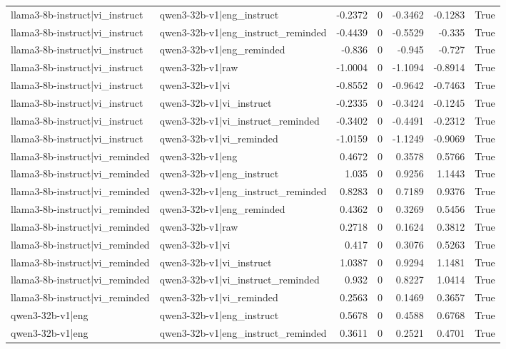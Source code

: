 \begin{table}
\begin{tabular}{l l r r r r l}
llama3-8b-instruct|vi_instruct & qwen3-32b-v1|eng_instruct & -0.2372 & 0 & -0.3462 & -0.1283 & True \\
llama3-8b-instruct|vi_instruct & qwen3-32b-v1|eng_instruct_reminded & -0.4439 & 0 & -0.5529 & -0.335 & True \\
llama3-8b-instruct|vi_instruct & qwen3-32b-v1|eng_reminded & -0.836 & 0 & -0.945 & -0.727 & True \\
llama3-8b-instruct|vi_instruct & qwen3-32b-v1|raw & -1.0004 & 0 & -1.1094 & -0.8914 & True \\
llama3-8b-instruct|vi_instruct & qwen3-32b-v1|vi & -0.8552 & 0 & -0.9642 & -0.7463 & True \\
llama3-8b-instruct|vi_instruct & qwen3-32b-v1|vi_instruct & -0.2335 & 0 & -0.3424 & -0.1245 & True \\
llama3-8b-instruct|vi_instruct & qwen3-32b-v1|vi_instruct_reminded & -0.3402 & 0 & -0.4491 & -0.2312 & True \\
llama3-8b-instruct|vi_instruct & qwen3-32b-v1|vi_reminded & -1.0159 & 0 & -1.1249 & -0.9069 & True \\
llama3-8b-instruct|vi_reminded & qwen3-32b-v1|eng & 0.4672 & 0 & 0.3578 & 0.5766 & True \\
llama3-8b-instruct|vi_reminded & qwen3-32b-v1|eng_instruct & 1.035 & 0 & 0.9256 & 1.1443 & True \\
llama3-8b-instruct|vi_reminded & qwen3-32b-v1|eng_instruct_reminded & 0.8283 & 0 & 0.7189 & 0.9376 & True \\
llama3-8b-instruct|vi_reminded & qwen3-32b-v1|eng_reminded & 0.4362 & 0 & 0.3269 & 0.5456 & True \\
llama3-8b-instruct|vi_reminded & qwen3-32b-v1|raw & 0.2718 & 0 & 0.1624 & 0.3812 & True \\
llama3-8b-instruct|vi_reminded & qwen3-32b-v1|vi & 0.417 & 0 & 0.3076 & 0.5263 & True \\
llama3-8b-instruct|vi_reminded & qwen3-32b-v1|vi_instruct & 1.0387 & 0 & 0.9294 & 1.1481 & True \\
llama3-8b-instruct|vi_reminded & qwen3-32b-v1|vi_instruct_reminded & 0.932 & 0 & 0.8227 & 1.0414 & True \\
llama3-8b-instruct|vi_reminded & qwen3-32b-v1|vi_reminded & 0.2563 & 0 & 0.1469 & 0.3657 & True \\
qwen3-32b-v1|eng & qwen3-32b-v1|eng_instruct & 0.5678 & 0 & 0.4588 & 0.6768 & True \\
qwen3-32b-v1|eng & qwen3-32b-v1|eng_instruct_reminded & 0.3611 & 0 & 0.2521 & 0.4701 & True \\

\end{tabular}
\end{table}
